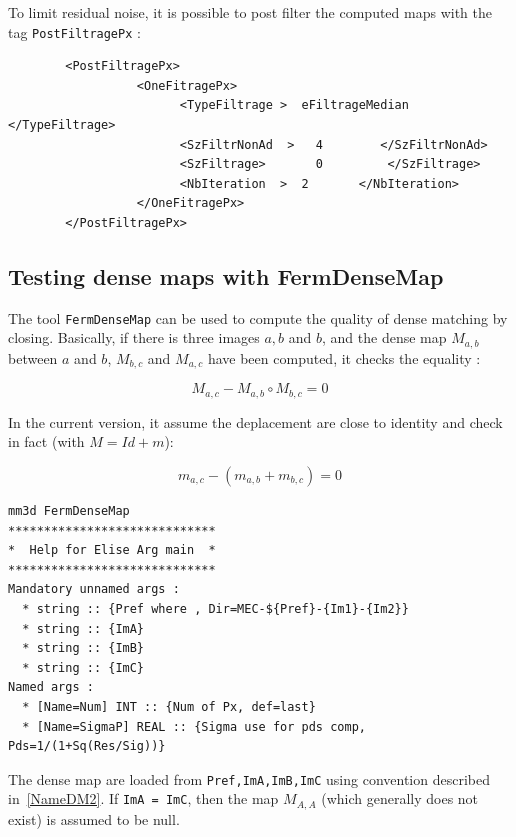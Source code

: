 To limit residual noise, it is possible to  post filter the computed  maps with the
tag {\tt PostFiltragePx} :

\begin{verbatim}
        <PostFiltragePx>
                  <OneFitragePx>
                        <TypeFiltrage >  eFiltrageMedian  </TypeFiltrage>
                        <SzFiltrNonAd  >   4        </SzFiltrNonAd>
                        <SzFiltrage>       0         </SzFiltrage>
                        <NbIteration  >  2       </NbIteration>
                  </OneFitragePx>
        </PostFiltragePx>
\end{verbatim}


\subsection{Testing dense maps with FermDenseMap}

\label{FermDenseMap}

The tool {\tt FermDenseMap} can be used to compute the quality of dense matching by closing.
Basically, if there is three images $a,b$ and $b$, and the dense map $M_{a,b}$ between
$a$ and $b$, $M_{b,c}$ and $M_{a,c}$ have been computed, it checks the equality :

\begin{equation}
M_{a,c} - M_{a,b} \circ  M_{b,c}  = 0
\end{equation}

In the current version, it assume the deplacement are close to identity and check in fact 
(with $M=Id+m$):

\begin{equation}
m_{a,c} - (m_{a,b}  + m_{b,c})  = 0 \label{EqResFDM}
\end{equation}


\begin{verbatim}
mm3d FermDenseMap
*****************************
*  Help for Elise Arg main  *
*****************************
Mandatory unnamed args : 
  * string :: {Pref where , Dir=MEC-${Pref}-{Im1}-{Im2}}
  * string :: {ImA}
  * string :: {ImB}
  * string :: {ImC}
Named args : 
  * [Name=Num] INT :: {Num of Px, def=last}
  * [Name=SigmaP] REAL :: {Sigma use for pds comp, Pds=1/(1+Sq(Res/Sig))}
\end{verbatim}

The dense map are loaded from {\tt Pref,ImA,ImB,ImC} using convention described in~\ref{NameDM2}.
If {\tt ImA = ImC}, then the map $M_{A,A}$ (which generally does not exist) is assumed to
be null.

